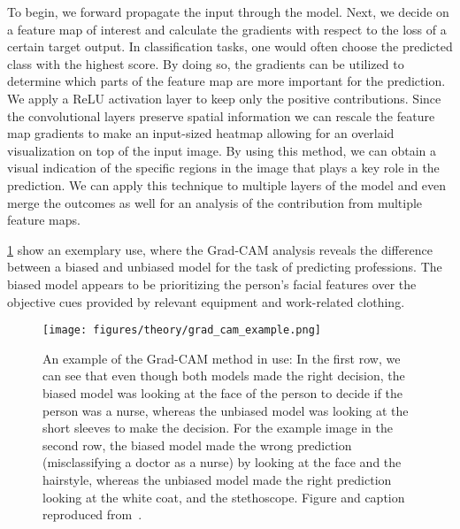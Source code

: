To begin, we forward propagate the input through the model. Next, we decide on a
feature map of interest and calculate the gradients with respect to the loss of
a certain target output. In classification tasks, one would often choose the
predicted class with the highest score. By doing so, the gradients can be
utilized to determine which parts of the feature map are more important for the
prediction. We apply a ReLU activation layer to keep only the
positive contributions. Since the convolutional layers preserve spatial
information we can rescale the feature map gradients to make an input-sized
heatmap allowing for an overlaid visualization on top of the input image. By using this method, we can obtain a visual indication of the specific regions in the image that plays a key role in the prediction. We can apply this technique to multiple layers of the model and even merge the outcomes as well for an analysis of the contribution from multiple feature maps.

\cref{fig:grad_cam_example} show an exemplary use, where the Grad-CAM analysis reveals the difference between a biased and unbiased model for the task of predicting professions. The biased model appears to be prioritizing the person's facial features over the objective cues provided by relevant equipment and work-related clothing.

\begin{figure}[!htb]
  \centering
  \texttt{[image: figures/theory/grad\_cam\_example.png]}
  \caption{An example of the Grad-CAM method in use: In the first row, we can see that even though both models made the right decision, the biased model was looking at the face of the person to decide if the person was a nurse, whereas the unbiased model was looking at the short sleeves to make the decision. For the example image in the second row, the biased model made the wrong prediction (misclassifying a doctor as a nurse) by looking at the face and the hairstyle, whereas the unbiased model made the right prediction looking at the white coat, and the stethoscope. Figure and caption reproduced from~\cite{Selvaraju_2019}. }
  \label{fig:grad_cam_example}
\end{figure}






